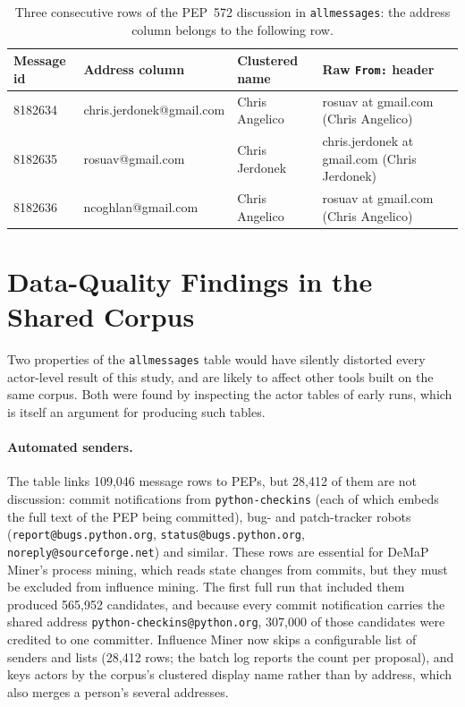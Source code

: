 \begin{table}[t]
\caption{Three consecutive rows of the PEP~572 discussion in \texttt{allmessages}: the address column belongs to the following row.}
\label{tab:shift}
\small
\begin{tabular}{llll}
\toprule
Message id & Address column & Clustered name & Raw \texttt{From:} header \\
\midrule
8182634 & chris.jerdonek@gmail.com & Chris Angelico & rosuav at gmail.com (Chris Angelico) \\
8182635 & rosuav@gmail.com & Chris Jerdonek & chris.jerdonek at gmail.com (Chris Jerdonek) \\
8182636 & ncoghlan@gmail.com & Chris Angelico & rosuav at gmail.com (Chris Angelico) \\
\bottomrule
\end{tabular}
\end{table}
\section{Data-Quality Findings in the Shared Corpus}
\label{sec:dataquality}

Two properties of the \texttt{allmessages} table would have silently distorted every actor-level result of this study, and are likely to affect other tools built on the same corpus. Both were found by inspecting the actor tables of early runs, which is itself an argument for producing such tables.

\paragraph{Automated senders.} The table links 109,046 message rows to PEPs, but 28,412 of them are not discussion: commit notifications from \texttt{python-checkins} (each of which embeds the full text of the PEP being committed), bug- and patch-tracker robots (\texttt{report@\allowbreak bugs.python.org}, \texttt{status@\allowbreak bugs.python.org}, \texttt{noreply@\allowbreak sourceforge.net}) and similar. These rows are essential for DeMaP Miner's process mining, which reads state changes from commits, but they must be excluded from influence mining. The first full run that included them produced 565,952 candidates, and because every commit notification carries the shared address \texttt{python-checkins@python.org}, 307,000 of those candidates were credited to one committer. Influence Miner now skips a configurable list of senders and lists (28,412 rows; the batch log reports the count per proposal), and keys actors by the corpus's clustered display name rather than by address, which also merges a person's several addresses.

